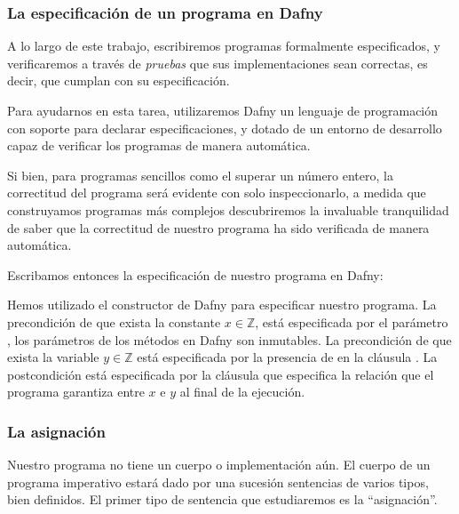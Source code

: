 \documentclass[12pt, a4paper, openany, fleqn]{book}
\begin{document}
    \subsubsection*{La especificación de un programa en Dafny}

    A lo largo de este trabajo, escribiremos programas formalmente especificados, y verificaremos a través de \textit{pruebas} que sus implementaciones sean correctas, es decir, que cumplan con su especificación.

    Para ayudarnos en esta tarea, utilizaremos Dafny un lenguaje de programación con soporte para declarar especificaciones, y dotado de un entorno de desarrollo capaz de verificar los programas de manera automática.

    Si bien, para programas sencillos como el superar un número entero, la correctitud del programa será evidente con solo inspeccionarlo, a medida que construyamos programas más complejos descubriremos la invaluable tranquilidad de saber que la correctitud de nuestro programa ha sido verificada de manera automática.

    Escribamos entonces la especificación de nuestro programa en Dafny:


    Hemos utilizado el constructor  de Dafny para especificar nuestro programa. La precondición de que exista la constante \begin{math}x \in \mathbb{Z}\end{math}, está especificada por el parámetro , los parámetros de los métodos en Dafny son inmutables. La precondición de que exista la variable \begin{math}y \in \mathbb{Z}\end{math} está especificada por la presencia de  en la cláusula .
    La postcondición está especificada por la cláusula  que especifica la relación que el programa garantiza entre $x$ e $y$ al final de la ejecución.

    \subsubsection*{La asignación}
    Nuestro programa no tiene un cuerpo o implementación aún. El cuerpo de un programa imperativo estará dado por una sucesión sentencias de varios tipos, bien definidos. El primer tipo de sentencia que estudiaremos es la ``asignación''.
\end{document}

